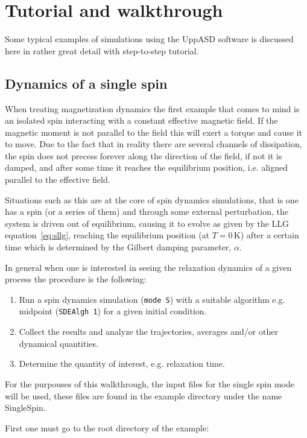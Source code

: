 \documentclass[11pt,fleqn,a4]{book} %
\begin{document}
\chapter{Tutorial and walkthrough}
Some typical examples of simulations using the UppASD software is discussed here in rather great detail with step-to-step tutorial. 

\section{Dynamics of a single spin}
When treating magnetization dynamics the first example that comes to mind is an isolated spin interacting with a constant effective magnetic field. If the magnetic moment is not parallel to the field this will exert a torque and cause it to move. Due to the fact that in reality there are several channels of dissipation, the spin does not precess forever along the direction of the field, if not it is damped, and after some time it reaches the equilibrium position, i.e. aligned parallel to the effective field.

Situations such as this are at the core of spin dynamics simulations, that is one has a spin (or a series of them) and through some external perturbation, the system is driven out of equilibrium, causing it to evolve as given by the LLG equation~\ref{eq:sllg}, reaching the equilibrium position (at $T=0\, \text{K}$) after a certain time which is determined by the Gilbert damping parameter, $\alpha$.

In general when one is interested in seeing the relaxation dynamics of a given process the procedure is the following:
\begin{enumerate}
\item Run a spin dynamics simulation (\verb;mode S;) with a suitable algorithm e.g. midpoint (\verb;SDEAlgh 1;) for a given initial condition.
\item Collect the results and analyze the trajectories, averages and/or other dynamical quantities.
\item Determine the quantity of interest, e.g. relaxation time.
\end{enumerate}

For the purpouses of this walkthrough, the input files for the single spin mode will be used, these files are found in the example directory under the name SingleSpin.

First one must go to the root directory of the example:
\end{document}
